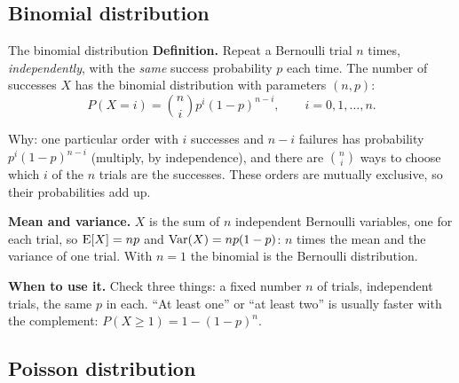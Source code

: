 \subsection*{Binomial distribution}

\begin{key}{The binomial distribution}
	\setlength{\parskip}{5pt}
	\textbf{Definition.} Repeat a Bernoulli trial $n$ times,
	\emph{independently}, with the \emph{same} success probability $p$ each
	time. The number of successes $X$ has the binomial distribution with
	parameters $(n,p)$:
	\[ P(X=i)=\binom{n}{i}p^i(1-p)^{n-i},\qquad i=0,1,\dots,n. \]
	\noindent\begin{minipage}[c]{.48\linewidth}
		Why: one particular order with $i$ successes and $n-i$ failures has
		probability $p^i(1-p)^{n-i}$ (multiply, by independence), and there are
		$\binom{n}{i}$ ways to choose which $i$ of the $n$ trials are the
		successes. These orders are mutually exclusive, so their probabilities
		add up.
	\end{minipage}\hfill
	\begin{minipage}[c]{.5\linewidth}
		\centering
		\figbinomial
	\end{minipage}

	\textbf{Mean and variance.} $X$ is the sum of $n$ independent Bernoulli
	variables, one for each trial, so $\operatorname{E}[X]=np$ and $\operatorname{Var}(X)=np(1-p)$: $n$
	times the mean and the variance of one trial. With $n=1$ the binomial is
	the Bernoulli distribution.

	\textbf{When to use it.} Check three things: a fixed number $n$ of
	trials, independent trials, the same $p$ in each. ``At least one'' or
	``at least two'' is usually faster with the complement:
	$P(X\ge1)=1-(1-p)^n$.
\end{key}


\subsection*{Poisson distribution}

